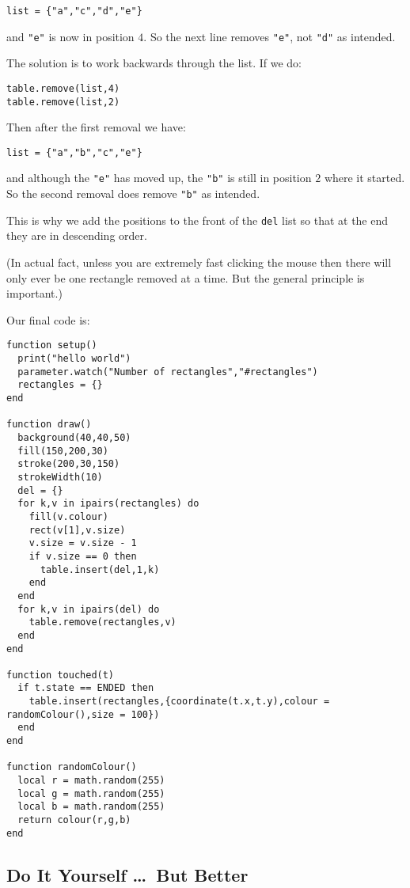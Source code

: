 \documentclass[
  xhtml,%
  use filename%
]{internet}
\begin{document}
\begin{verbatim}
list = {"a","c","d","e"}
\end{verbatim}

\noindent and \verb+"e"+ is now in position \(4\).
So the next line removes \verb+"e"+, not \verb+"d"+ as intended.

The solution is to work backwards through the list.
If we do:

\begin{verbatim}
table.remove(list,4)
table.remove(list,2)
\end{verbatim}

Then after the first removal we have:

\begin{verbatim}
list = {"a","b","c","e"}
\end{verbatim}

\noindent and although the \verb+"e"+ has moved up, the \verb+"b"+ is still in position \(2\) where it started.
So the second removal does remove \verb+"b"+ as intended.

This is why we add the positions to the front of the \verb+del+ list so that at the end they are in descending order.

(In actual fact, unless you are extremely fast clicking the mouse then there will only ever be one rectangle removed at a time.
But the general principle is important.)

Our final code is:

\begin{verbatim}
function setup()
  print("hello world")
  parameter.watch("Number of rectangles","#rectangles")
  rectangles = {}
end

function draw()
  background(40,40,50)
  fill(150,200,30)
  stroke(200,30,150)
  strokeWidth(10)
  del = {}
  for k,v in ipairs(rectangles) do
    fill(v.colour)
    rect(v[1],v.size)
    v.size = v.size - 1
    if v.size == 0 then
      table.insert(del,1,k)
    end
  end
  for k,v in ipairs(del) do
    table.remove(rectangles,v)
  end
end

function touched(t)
  if t.state == ENDED then
    table.insert(rectangles,{coordinate(t.x,t.y),colour = randomColour(),size = 100})
  end
end

function randomColour()
  local r = math.random(255)
  local g = math.random(255)
  local b = math.random(255)
  return colour(r,g,b)
end
\end{verbatim}

\subsection{Do It Yourself \dots\ But Better}
\end{document}
